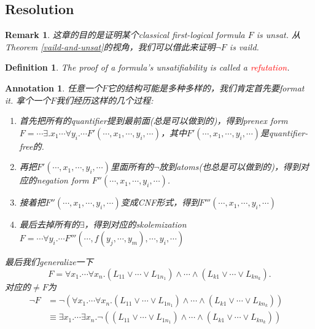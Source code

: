\documentclass{article}
\theoremstyle{plain}
\newtheorem{definition}[theorem]{Definition}
\newtheorem{remark}[theorem]{Remark}
\newtheorem{annotation}[theorem]{Annotation}
\theoremstyle{nonumberplain}
\newcommand{\redt}[1]{\textcolor{red}{#1}}
\begin{document}
\newpage
\subsection{Resolution}

\begin{remark}
\rm 这章的目的是证明某个classical first-logical formula $F$ is unsat. 从Theorem \ref{vaild-and-unsat}的视角，我们可以借此来证明$\neg F$ is vaild.
\end{remark}

\begin{definition}
\rm The proof of a formula's unsatifiability is called a \redt{refutation}.
\end{definition}

\begin{annotation}
\rm 任意一个$F$它的结构可能是多种多样的，我们肯定首先要format it. 拿个一个$F$我们经历这样的几个过程:
\begin{enumerate}
	\item 首先把所有的quantifier提到最前面(总是可以做到的)，得到prenex form $F = \cdots\exists. x_1 \cdots \forall y_i. \cdots F'(\cdots, x_1,\cdots,y_i,\cdots)$，其中$F'(\cdots,x_1,\cdots,y_i,\cdots)$是quantifier-free的.
	\item 再把$F'(\cdots,x_1,\cdots,y_i,\cdots)$里面所有的$\neg$放到atoms(也总是可以做到的)，得到对应的negation form $F''(\cdots, x_1,\cdots,y_i,\cdots)$.
	\item 接着把$F''(\cdots, x_1,\cdots,y_i,\cdots)$变成CNF形式，得到$F'''(\cdots, x_1,\cdots,y_i,\cdots)$
	\item 最后去掉所有的$\exists$，得到对应的skolemization $F = \cdots \forall y_i. \cdots F'''(\cdots,f(y_j,\cdots,y_m),\cdots,y_i,\cdots)$  
\end{enumerate}
最后我们generalize一下
\[
	F = \forall x_1. \cdots \forall x_n.(L_{11} \vee \cdots \vee L_{1n_1})\wedge  \cdots \wedge (L_{k1} \vee \cdots \vee L_{kn_k}).
\]
对应的$\neq F$为
\begin{equation} \label{eq:1}
	\begin{aligned}
	\neg F &= \neg(\forall x_1. \cdots \forall x_n.(L_{11} \vee \cdots \vee L_{1n_1})\wedge  \cdots \wedge (L_{k1} \vee \cdots \vee L_{kn_k})) \\
	&\equiv \exists x_1. \cdots \exists x_n. \neg((L_{11} \vee \cdots \vee L_{1n_1})\wedge  \cdots \wedge (L_{k1} \vee \cdots \vee L_{kn_k})) &  
	\end{aligned}	
\end{equation}
\end{annotation}
\end{document}
